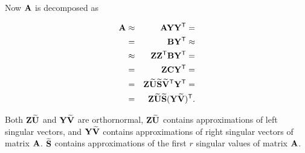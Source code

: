 Now $\mathbf{A}$ is decomposed as

\begin{eqnarray}
\mathbf{A} &\approx& \mathbf{A}\mathbf{Y}\mathbf{Y}^{\mathsf{T}} =
\\
&=& \mathbf{B}\mathbf{Y}^{\mathsf{T}} \approx \nonumber
\\
&\approx& \mathbf{Z}\mathbf{Z}^{\mathsf{T}}\mathbf{B}\mathbf{Y}^{\mathsf{T}} = \nonumber
\\
&=& \mathbf{Z}\mathbf{C}\mathbf{Y}^{\mathsf{T}} = \nonumber
\\
&=& \mathbf{Z}\mathbf{\widetilde{U}} \mathbf{\widetilde{S}} \mathbf{\widetilde{V}}^{\mathsf{T}}\mathbf{Y}^{\mathsf{T}} = \nonumber
\\
&=& \mathbf{Z}\mathbf{\widetilde{U}} \mathbf{\widetilde{S}} (\mathbf{Y}\mathbf{\widetilde{V}})^{\mathsf{T}}. \nonumber
\label{eq:redsvd}
\end{eqnarray}

\noindent
Both $\mathbf{Z}\mathbf{\widetilde{U}}$ and $\mathbf{Y}\mathbf{\widetilde{V}}$ are orthornormal, $\mathbf{Z}\mathbf{\widetilde{U}}$ contains approximations of left singular vectors, and $\mathbf{Y}\mathbf{\widetilde{V}}$ contains approximations of right singular vectors of matrix $\mathbf{A}$. $\mathbf{\widetilde{S}}$ contains approximations of the first $r$ singular values of matrix $\mathbf{A}$.


